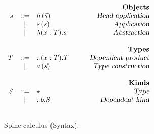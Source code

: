\begin{figure}
\begin{center}
\begin{math}
\begin{array}{rclr}
&&&\qquad\textsl{\bf Objects}\\
s

&::=& 
h\,(\vec{s}) 
& \qquad\textsl{Head application}
\\
&|& 
s\,(\vec{s}) 
& \qquad\textsl{Application}
\\

&|&
\lambda (x : T). s
& \qquad\textsl{Abstraction}
\\
\\
&&&\qquad\textsl{\bf Types}\\
T

&::=&
\pi (x : T). T
& \qquad\textsl{Dependent product}
\\

&|&
a\,(\vec{s})
& \qquad\textsl{Type construction}
\\
\\
&&&\qquad\textsl{\bf Kinds}\\
S

&::=&
\star
& \qquad\textsl{Type}
\\

&|&
\pi b. S
& \qquad\textsl{Dependent kind}
\\
\\

\end{array}
\end{math}
\end{center}
\caption{Spine calculus (Syntax).}
\label{fig:syntax-s2}
\end{figure}
